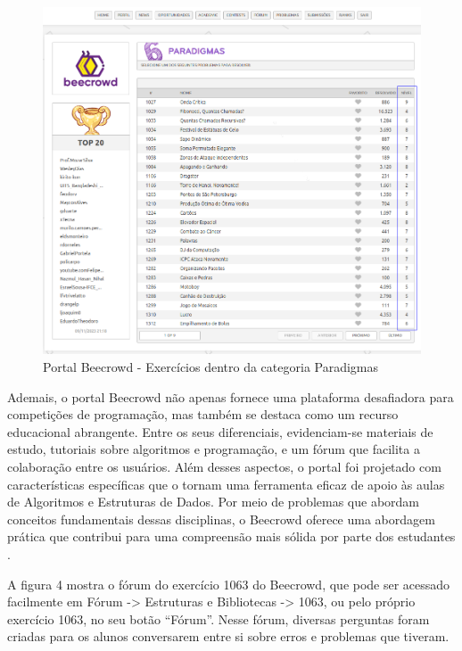 \begin{figure}[h!]
	   \centering
            \caption{Portal Beecrowd - Exercícios dentro da categoria Paradigmas}
            \label{fig:ModeloConceitual}
	   	\includegraphics[scale=0.3]{pictures/beecrowd_paradigmas.png}
\end{figure}

Ademais, o portal Beecrowd não apenas fornece uma plataforma desafiadora para competições de programação, mas também se destaca como um recurso educacional abrangente. Entre os seus diferenciais, evidenciam-se materiais de estudo, tutoriais sobre algoritmos e programação, e um fórum que facilita a colaboração entre os usuários. Além desses aspectos, o portal foi projetado com características específicas que o tornam uma ferramenta eficaz de apoio às aulas de Algoritmos e Estruturas de Dados. Por meio de problemas que abordam conceitos fundamentais dessas disciplinas, o Beecrowd oferece uma abordagem prática que contribui para uma compreensão mais sólida por parte dos estudantes \cite[p.~2]{beztonin2012}. 

A figura 4 mostra o fórum do exercício 1063 do Beecrowd, que pode ser acessado facilmente em Fórum -> Estruturas e Bibliotecas -> 1063, ou pelo próprio exercício 1063, no seu botão “Fórum”. Nesse fórum, diversas perguntas foram criadas para os alunos conversarem entre si sobre erros e problemas que tiveram.

